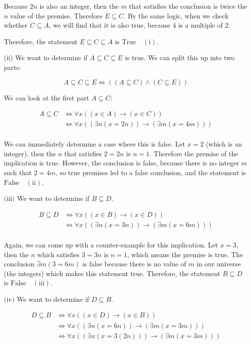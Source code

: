 \documentclass{article}
\newcommand{\T}{\text{True}}
\newcommand{\F}{\text{False}}
\newcommand{\subproblem}[1]{$\boxed{\text{(#1)}}$}
\newcommand{\subsolution}[2]{\boxed{#2\quad(\text{#1})}}
\newcommand{\multistep}[1]{\begin{array}{rl} #1 \end{array}}
\newcommand{\subeq}{\subseteq}
\begin{document}
\begin{multicols*}{2}
Because $2n$ is also an integer, then the $m$ that satisfies the
conclusion is twice the $n$ value of the premise. Therefore
$E\subseteq{}C$. By the same logic, when we check whether
$C\subseteq{}A$, we will find that it is also true, because $4$ is a
multiple of $2$.

Therefore, the statement $E\subseteq{}C\subseteq{}A$ is $\subsolution{i}{\T}$.

%
\subproblem{ii} We want to determine if $A\subeq{}C\subeq{}E$ is
true. We can split this up into two parts:

\[
A\subeq{}C\subeq{}E\Leftrightarrow((A\subeq C)\wedge(C\subeq E))
\]

We can look at the first part $A\subeq{}C$:

\[
\multistep{
A\subeq{}C&\Leftrightarrow \forall x((x\in A)\rightarrow(x\in C)) \\
&\Leftrightarrow \forall x((\exists n(x=2n))\rightarrow(\exists m(x=4m))) \\
}
\]

We can immediately determine a case where this is false. Let $x=2$
(which is an integer), then the $n$ that satisfies $2=2n$ is
$n=1$. Therefore the premise of the implication is true. However, the
conclusion is false, because there is no integer $m$ such that $2=4m$,
so true premises led to a false conclusion, and the statement is
$\subsolution{ii}{\F}$.

%
\subproblem{iii} We want to determine if $B\subeq{}D$.

\[
\multistep{
B\subeq D&\Leftrightarrow \forall x((x\in B)\rightarrow(x\in D)) \\
&\Leftrightarrow \forall x((\exists n(x=3n))\rightarrow(\exists m(x=6m))) \\
}
\]

Again, we can come up with a counter-example for this implication. Let
$x=3$, then the $n$ which satisfies $3=3n$ is $n=1$, which means the
premise is true. The conclusion $\exists m(3=6m)$ is false because
there is no value of $m$ in our universe (the integers) which makes
this statement true. Therefore, the statement $B\subeq{}D$ is
$\subsolution{iii}{\F}$.

%
\subproblem{iv} We want to determine if $D\subeq{}B$.

\[
\multistep{
D\subeq B&\Leftrightarrow \forall x((x\in D)\rightarrow(x\in B)) \\
&\Leftrightarrow \forall x((\exists n(x=6n))\rightarrow(\exists m(x=3m))) \\
&\Leftrightarrow \forall x((\exists n(x=3(2n)))\rightarrow(\exists m(x=3m))) \\
}
\]


\end{multicols*}
\end{document}

